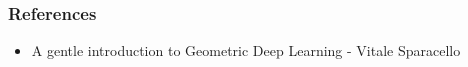 








\begin{frame}[fragile]\frametitle{References}

\begin{itemize}
\item A gentle introduction to Geometric Deep Learning - Vitale Sparacello
\end{itemize}
	  
\end{frame}
